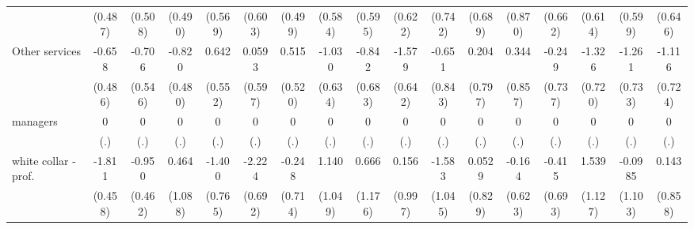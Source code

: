 {\begin{tabular}{l*{16}{c}}
                    &     (0.487)         &     (0.508)         &     (0.490)         &     (0.569)         &     (0.603)         &     (0.499)         &     (0.584)         &     (0.595)         &     (0.622)         &     (0.742)         &     (0.689)         &     (0.870)         &     (0.662)         &     (0.614)         &     (0.599)         &     (0.646)         \\
[1em]
Other services      &      -0.658         &      -0.706         &      -0.820         &       0.642         &      0.0593         &       0.515         &      -1.030         &      -0.842         &      -1.579\sym{*}  &      -0.651         &       0.204         &       0.344         &      -0.249         &      -1.326         &      -1.261         &      -1.116         \\
                    &     (0.486)         &     (0.546)         &     (0.480)         &     (0.552)         &     (0.597)         &     (0.520)         &     (0.634)         &     (0.683)         &     (0.642)         &     (0.843)         &     (0.797)         &     (0.857)         &     (0.737)         &     (0.720)         &     (0.733)         &     (0.724)         \\
[1em]
managers            &           0         &           0         &           0         &           0         &           0         &           0         &           0         &           0         &           0         &           0         &           0         &           0         &           0         &           0         &           0         &           0         \\
                    &         (.)         &         (.)         &         (.)         &         (.)         &         (.)         &         (.)         &         (.)         &         (.)         &         (.)         &         (.)         &         (.)         &         (.)         &         (.)         &         (.)         &         (.)         &         (.)         \\
[1em]
white collar - prof.&      -1.811\sym{***}&      -0.950\sym{*}  &       0.464         &      -1.400         &      -2.224\sym{**} &      -0.248         &       1.140         &       0.666         &       0.156         &      -1.583         &      0.0529         &      -0.164         &      -0.415         &       1.539         &     -0.0985         &       0.143         \\
                    &     (0.458)         &     (0.462)         &     (1.088)         &     (0.765)         &     (0.692)         &     (0.714)         &     (1.049)         &     (1.176)         &     (0.997)         &     (1.045)         &     (0.829)         &     (0.623)         &     (0.693)         &     (1.127)         &     (1.103)         &     (0.858)         \\

\end{tabular}}
